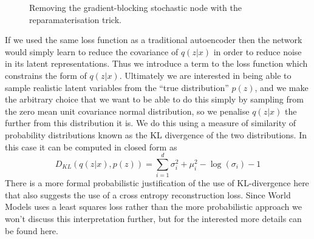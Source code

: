 \documentclass{article}
\numberwithin{figure}{section}
\theoremstyle{definition}
\begin{document}
\begin{figure}[h]
\caption{Removing the gradient-blocking stochastic node with the reparamaterisation trick.}
\end{figure}

If we used the same loss function as a traditional autoencoder then the network would simply learn to reduce the covariance of $q(z|x)$ in order to reduce noise in its latent representations.
Thus we introduce a term to the loss function which constrains the form of $q(z|x)$.
Ultimately we are interested in being able to sample realistic latent variables from the ``true distribution'' $p(z)$, and we make the arbitrary choice that we want to be able to do this simply by sampling from the zero mean unit covariance normal distribution, so we penalise $q(z|x)$ the further from this distribution it is.
We do this using a measure of similarity of probability distributions known as the KL divergence of the two distributions.
In this case it can be computed in closed form as
$$D_{KL}(q(z|x),p(z)) = \sum_{i=1}^d \sigma_i^2 + \mu_i^2 - \log(\sigma_i)-1$$
There is a more formal probabilistic justification of the use of KL-divergence here that also suggests the use of a cross entropy reconstruction loss.
Since World Models uses a least squares loss rather than the more probabilistic approach we won't discuss this interpretation further, but for the interested more details can be found here.
\end{document}

